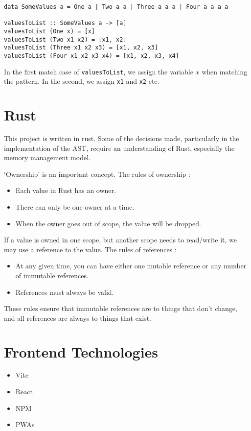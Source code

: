 \begin{verbatim}
data SomeValues a = One a | Two a a | Three a a a | Four a a a a

valuesToList :: SomeValues a -> [a]
valuesToList (One x) = [x]
valuesToList (Two x1 x2) = [x1, x2]
valuesToList (Three x1 x2 x3) = [x1, x2, x3]
valuesToList (Four x1 x2 x3 x4) = [x1, x2, x3, x4]
\end{verbatim}

\noindent In the first match case of \verb|valuesToList|, we assign the variable $x$ when matching the pattern. In the second, we assign \verb|x1| and \verb|x2| etc. 

\section{Rust}
\label{bg:rust}
This project is written in rust. Some of the decisions made, particularly in the implementation of the AST, require an understanding of Rust, especially the memory management model.

`Ownership' is an important concept. The rules of ownership \cite{rust_book}:
\begin{itemize}
    \item Each value in Rust has an owner.
    \item There can only be one owner at a time.
    \item When the owner goes out of scope, the value will be dropped.
\end{itemize}   

If a value is owned in one scope, but another scope needs to read/write it, we may use a reference to the value. The rules of references \cite{rust_book}:
\begin{itemize}
    \item At any given time, you can have either one mutable reference or any number of immutable references. 
    \item References must always be valid.
\end{itemize}

These rules ensure that immutable references are to things that don't change, and all references are always to things that exist.

\section{Frontend Technologies}
\label{bg:frontend}
\label{bg:pwa}
\begin{itemize}
    \item Vite
    \item React
    \item NPM
    \item PWAs
\end{itemize}


